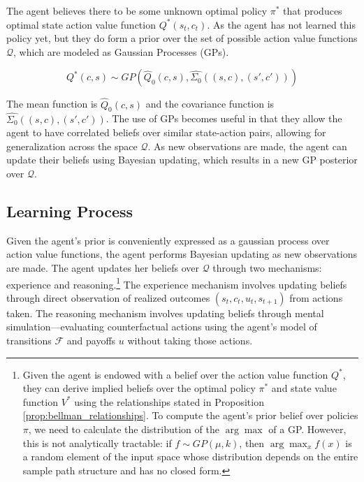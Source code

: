 The agent believes there to be some unknown optimal policy $\pi^*$ that produces
optimal state action value function $Q^*(s_t, c_t)$. As the agent has not learned this policy
yet, but they do form a prior over the set of possible action value functions $\mathcal{Q}$, which
are modeled as Gaussian Processes (GPs).

\begin{equation}
    Q^*(c,s) \sim GP\left(\hat{Q}_0(c,s), \hat{\Sigma_0}((s,c), (s', c'))\right)
\end{equation}

The mean function is $\hat{Q}_0(c,s)$ and the covariance function is $\hat{\Sigma_0}((s,c), (s', c'))$.
The use of GPs becomes useful in that they allow the agent to have correlated beliefs over
similar state-action pairs, allowing for generalization across the space $\mathcal{Q}$.
As new observations are made, the agent can update their beliefs using Bayesian updating, 
which results in a new GP posterior over $\mathcal{Q}$.

\subsection{Learning Process}

Given the agent's prior is conveniently expressed as a gaussian process over action value functions,
the agent performs Bayesian updating as new observations are made. The agent updates her beliefs 
over $\mathcal{Q}$ through two mechanisms: experience  and reasoning.\footnote{
    Given the agent is endowed with a belief over the action value function $Q^*$, they can derive
    implied beliefs over the optimal policy $\pi^*$ and state value function $V^*$ using the relationships
    stated in Proposition \ref{prop:bellman_relationships}. To compute the agent's prior belief over policies 
    $\pi$, we need to calculate the distribution of the $\arg\max$ of a GP. However, this is not analytically 
    tractable: if $f \sim GP(\mu, k)$, then $\arg\max_x f(x)$ is a random element of the input space whose 
    distribution depends on the entire sample path structure and has no closed form.
}
The experience mechanism involves updating beliefs through direct observation of realized outcomes 
$(s_t, c_t, u_t, s_{t+1})$ from actions taken. The reasoning mechanism involves updating 
beliefs through mental simulation---evaluating counterfactual actions using the agent's model of transitions $\mathcal{F}$ and 
payoffs $u$ without taking those actions.


